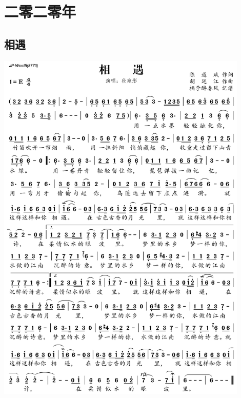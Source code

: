 \documentclass[cn,pad,twocol]{elegantbook}
\begin{document}
\chapter{二零二零年}
\section{相遇} \includegraphics[width=0.9\textwidth]{macos/2020相遇.png}
\end{document}
